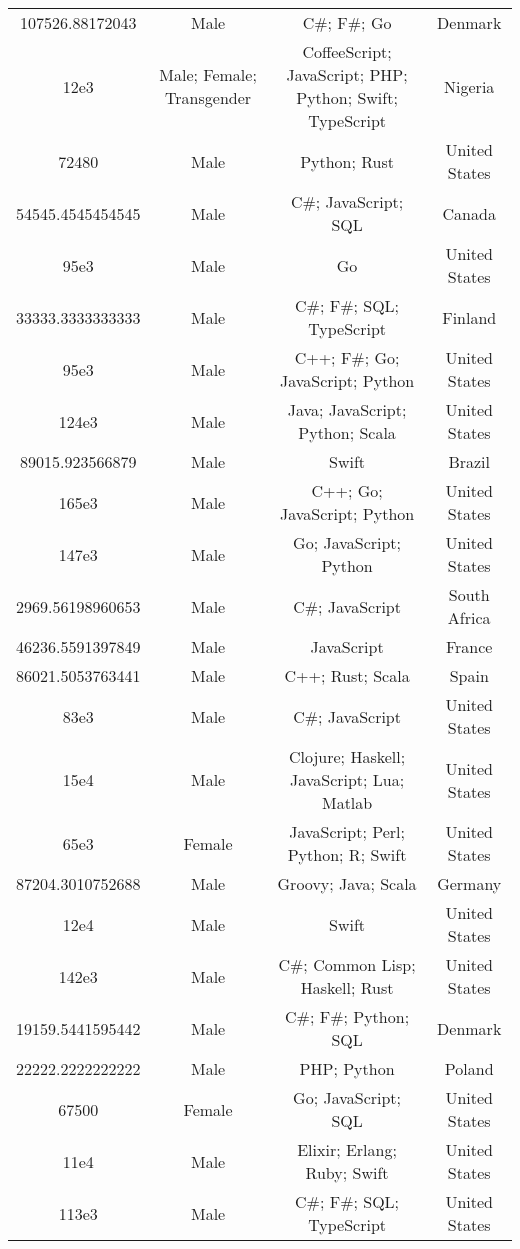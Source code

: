 \begin{center}
\begin{tabular}{ |c|c|c|c| }
107526.88172043  &  Male  &  C\#; F\#; Go  &  Denmark  \\ 
12e3  &  Male; Female; Transgender  &  CoffeeScript; JavaScript; PHP; Python; Swift; TypeScript  &  Nigeria  \\ 
72480  &  Male  &  Python; Rust  &  United States  \\ 
54545.4545454545  &  Male  &  C\#; JavaScript; SQL  &  Canada  \\ 
95e3  &  Male  &  Go  &  United States  \\ 
33333.3333333333  &  Male  &  C\#; F\#; SQL; TypeScript  &  Finland  \\ 
95e3  &  Male  &  C++; F\#; Go; JavaScript; Python  &  United States  \\ 
124e3  &  Male  &  Java; JavaScript; Python; Scala  &  United States  \\ 
89015.923566879  &  Male  &  Swift  &  Brazil  \\ 
165e3  &  Male  &  C++; Go; JavaScript; Python  &  United States  \\ 
147e3  &  Male  &  Go; JavaScript; Python  &  United States  \\ 
2969.56198960653  &  Male  &  C\#; JavaScript  &  South Africa  \\ 
46236.5591397849  &  Male  &  JavaScript  &  France  \\ 
86021.5053763441  &  Male  &  C++; Rust; Scala  &  Spain  \\ 
83e3  &  Male  &  C\#; JavaScript  &  United States  \\ 
15e4  &  Male  &  Clojure; Haskell; JavaScript; Lua; Matlab  &  United States  \\ 
65e3  &  Female  &  JavaScript; Perl; Python; R; Swift  &  United States  \\ 
87204.3010752688  &  Male  &  Groovy; Java; Scala  &  Germany  \\ 
12e4  &  Male  &  Swift  &  United States  \\ 
142e3  &  Male  &  C\#; Common Lisp; Haskell; Rust  &  United States  \\ 
19159.5441595442  &  Male  &  C\#; F\#; Python; SQL  &  Denmark  \\ 
22222.2222222222  &  Male  &  PHP; Python  &  Poland  \\ 
67500  &  Female  &  Go; JavaScript; SQL  &  United States  \\ 
11e4  &  Male  &  Elixir; Erlang; Ruby; Swift  &  United States  \\ 
113e3  &  Male  &  C\#; F\#; SQL; TypeScript  &  United States  \\ 

\end{tabular}
\end{center}
